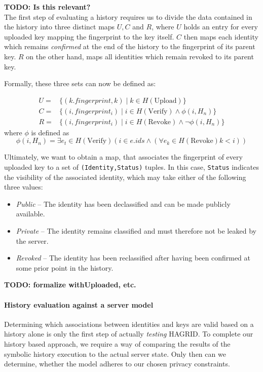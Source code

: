 \textbf{TODO: Is this relevant?} \\
The first step of evaluating a history requires us to divide the data contained in the history into three distinct maps \(U,C\) and \(R\), where \(U\) holds an entry for every uploaded key mapping the fingerprint to the key itself. \(C\) then maps each identity which remains \emph{confirmed} at the end of the history to the fingerprint of its parent key. \(R\) on the other hand, maps all identities which remain revoked to its parent key.

Formally, these three sets can now be defined as: 

\begin{equation}
    \begin{aligned}
        U =& \{(k.fingerprint,k)  \mid k \in H(\text{Upload}) \} \\
        C =& \{(i, fingerprint_i) \mid i \in H(\text{Verify}) \wedge \phi(i, H_n) \} \\
        R =& \{(i, fingerprint_i) \mid i \in H(\text{Revoke}) \wedge \neg \phi(i,H_n)\}
    \end{aligned}
\end{equation}
   where \(\phi\) is defined as 
\begin{equation}
    \phi(i,H_n) = \exists e_t\in H(\text{Verify}) ( i \in e.ids \wedge (\forall e_k \in H(\text{Revoke}) k < i  ))
\end{equation}
 
Ultimately, we want to obtain a map, that associates the fingerprint of every uploaded key to a set of \texttt{(Identity,Status)} tuples. In this case, \texttt{Status} indicates the visibility of the associated identity, which may take either of the following three values: 
\begin{itemize}
    \item \emph{Public} -- The identity has been declassified and can be made publicly available.
    \item \emph{Private} -- The identity remains classified and must therefore not be leaked by the server.
    \item \emph{Revoked} -- The identity has been reclassified after having been confirmed at some prior point in the history.
\end{itemize}

\textbf{TODO: formalize withUploaded, etc. }

\paragraph{History evaluation against a server model}
Determining which associations between identities and keys are valid based on a history alone is only the first step of actually \emph{testing} HAGRID. To complete our history based approach, we require a way of comparing the results of the symbolic history execution to the actual server state. Only then can we determine, whether the model adheres to our chosen privacy constraints.



